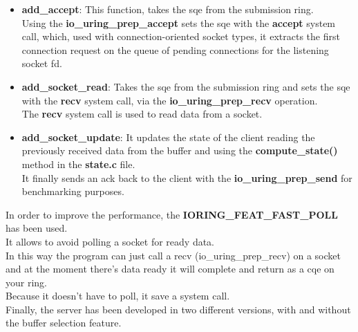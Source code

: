 \documentclass[10pt, oneside,english]{article}   	%
\begin{document}
\begin{itemize}
    \item \textbf{add\_accept}: This function, takes the sqe from the submission ring. \\ Using the \textbf{io\_uring\_prep\_accept} sets the sqe with the \textbf{accept} system call, which, used with connection-oriented socket types, it extracts the first connection request on the queue of pending connections for the listening socket fd.
    \item \textbf{add\_socket\_read}: Takes the sqe from the submission ring and sets the sqe with the \textbf{recv} system call, via the \textbf{io\_uring\_prep\_recv} operation. \\ The \textbf{recv} system call is used to read data from a socket.
    \item \textbf{add\_socket\_update}: It updates the state of the client reading the previously received data from the buffer and using the \textbf{compute\_state()} method in the \textbf{state.c} file.\\ It finally sends an ack back to the client with the \textbf{io\_uring\_prep\_send} for benchmarking purposes.
\end{itemize}

In order to improve the performance, the  \textbf{IORING\_FEAT\_FAST\_POLL} has been used. \\
It allows to avoid polling a socket for ready data.  \\
In this way the program can just call a recv (io\_uring\_prep\_recv) on a socket and at the moment there’s data ready it will complete and return as a cqe on your ring.  \\
Because it doesn’t have to poll, it save a system call. \\
Finally, the server has been developed in two different versions, with and without the buffer selection feature. \\
\end{document}
